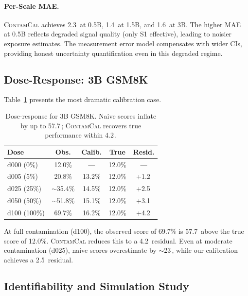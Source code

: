 \documentclass[11pt,a4paper]{article}
\newcommand{\contamcal}{\textsc{ContamCal}}
\newcommand{\pp}{\,\text{pp}}
\begin{document}
\paragraph{Per-Scale MAE.}
\contamcal{} achieves 2.3\pp{} at 0.5B, 1.4\pp{} at 1.5B, and 1.6\pp{} at 3B.
The higher MAE at 0.5B reflects degraded signal quality (only S1 effective), leading to noisier exposure estimates.
The measurement error model compensates with wider CIs, providing honest uncertainty quantification even in this degraded regime.

\subsection{Dose-Response: 3B GSM8K}
\label{sec:dose_response}

Table~\ref{tab:dose_response} presents the most dramatic calibration case.

\begin{table}[t]
\centering
\small
\caption{Dose-response for 3B GSM8K. Naive scores inflate by up to 57.7\pp{}; \contamcal{} recovers true performance within 4.2\pp{}.}
\label{tab:dose_response}
\begin{tabular}{lcccc}
\toprule
\textbf{Dose} & \textbf{Obs.} & \textbf{Calib.} & \textbf{True} & \textbf{Resid.} \\
\midrule
d000 (0\%)   & 12.0\% & ---    & 12.0\% & --- \\
d005 (5\%)   & 20.8\% & 13.2\% & 12.0\% & +1.2\pp{} \\
d025 (25\%)  & $\sim$35.4\% & 14.5\% & 12.0\% & +2.5\pp{} \\
d050 (50\%)  & $\sim$51.8\% & 15.1\% & 12.0\% & +3.1\pp{} \\
d100 (100\%) & 69.7\% & 16.2\% & 12.0\% & +4.2\pp{} \\
\bottomrule
\end{tabular}
\end{table}

At full contamination (d100), the observed score of 69.7\% is 57.7\pp{} above the true score of 12.0\%.
\contamcal{} reduces this to a 4.2\pp{} residual.
Even at moderate contamination (d025), naive scores overestimate by $\sim$23\pp{}, while our calibration achieves a 2.5\pp{} residual.

\subsection{Identifiability and Simulation Study}
\label{sec:identifiability}
\end{document}
